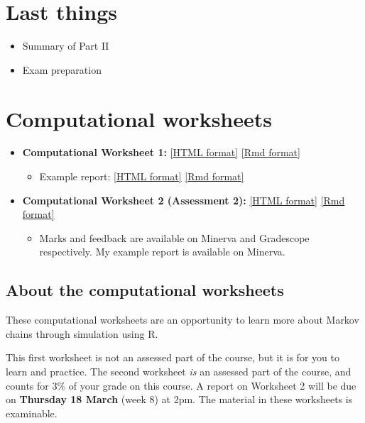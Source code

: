 \documentclass[
  a4paper,
]{article}
\providecommand{\tightlist}{%
  \setlength{\itemsep}{0pt}\setlength{\parskip}{0pt}}
\theoremstyle{definition}
\theoremstyle{definition}
\theoremstyle{definition}
\theoremstyle{remark}
\begin{document}
\hypertarget{S22-end}{%
\section{Last things}\label{S22-end}}

\begin{itemize}
\tightlist
\item
  Summary of Part II
\item
  Exam preparation
\end{itemize}

\hypertarget{computing}{%
\section*{Computational worksheets}\label{computing}}

\begin{itemize}
\tightlist
\item
  \textbf{Computational Worksheet 1:} \href{computing/C1.html}{{[}HTML format{]}} \href{computing/C1.Rmd}{{[}Rmd format{]}}

  \begin{itemize}
  \tightlist
  \item
    Example report: \href{computing/C1-example.html}{{[}HTML format{]}} \href{computing/C1-example.Rmd}{{[}Rmd format{]}}
  \end{itemize}
\item
  \textbf{Computational Worksheet 2 (Assessment 2):} \href{computing/C2.html}{{[}HTML format{]}} \href{computing/C2.Rmd}{{[}Rmd format{]}}

  \begin{itemize}
  \tightlist
  \item
    Marks and feedback are available on Minerva and Gradescope respectively. My example report is available on Minerva.
  \end{itemize}
\end{itemize}

\hypertarget{C-about}{%
\subsection*{About the computational worksheets}\label{C-about}}

These computational worksheets are an opportunity to learn more about Markov chains through simulation using R.

This first worksheet is not an assessed part of the course, but it is for you to learn and practice. The second worksheet \emph{is} an assessed part of the course, and counts for 3\% of your grade on this course. A report on Worksheet 2 will be due on \textbf{Thursday 18 March} (week 8) at 2pm. The material in these worksheets is examinable.
\end{document}
